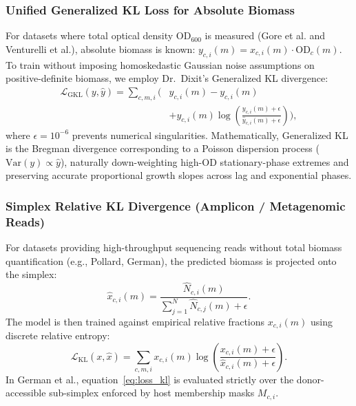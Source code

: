 \subsubsection{Unified Generalized KL Loss for Absolute Biomass}
For datasets where total optical density $\text{OD}_{600}$ is measured (Gore et al. and Venturelli et al.), absolute biomass is known: $y_{c, i}(m) = x_{c, i}(m) \cdot \text{OD}_{c}(m)$. To train without imposing homoskedastic Gaussian noise assumptions on positive-definite biomass, we employ Dr.~Dixit's Generalized KL divergence:
\begin{equation}
    \label{eq:loss_gkl}
    \begin{aligned}
    \mathcal{L}_{\text{GKL}}(y, \hat{y}) = \sum_{c, m, i} \Big( &\hat{y}_{c, i}(m) - y_{c, i}(m) \\
    &+ y_{c, i}(m) \log \left( \frac{y_{c, i}(m) + \epsilon}{\hat{y}_{c, i}(m) + \epsilon} \right) \Big),
    \end{aligned}
\end{equation}
where $\epsilon = 10^{-6}$ prevents numerical singularities. Mathematically, Generalized KL is the Bregman divergence corresponding to a Poisson dispersion process ($\text{Var}(y) \propto \hat{y}$), naturally down-weighting high-OD stationary-phase extremes and preserving accurate proportional growth slopes across lag and exponential phases.

\subsubsection{Simplex Relative KL Divergence (Amplicon / Metagenomic Reads)}
For datasets providing high-throughput sequencing reads without total biomass quantification (e.g., Pollard, German), the predicted biomass is projected onto the simplex:
\begin{equation}
    \hat{x}_{c, i}(m) = \frac{\hat{N}_{c, i}(m)}{\sum_{j=1}^N \hat{N}_{c, j}(m) + \epsilon}.
\end{equation}
The model is then trained against empirical relative fractions $x_{c, i}(m)$ using discrete relative entropy:
\begin{equation}
    \label{eq:loss_kl}
    \mathcal{L}_{\text{KL}}(x, \hat{x}) = \sum_{c, m, i} x_{c, i}(m) \log \left( \frac{x_{c, i}(m) + \epsilon}{\hat{x}_{c, i}(m) + \epsilon} \right).
\end{equation}
In German et al., equation~\eqref{eq:loss_kl} is evaluated strictly over the donor-accessible sub-simplex enforced by host membership masks $M_{c, i}$.

